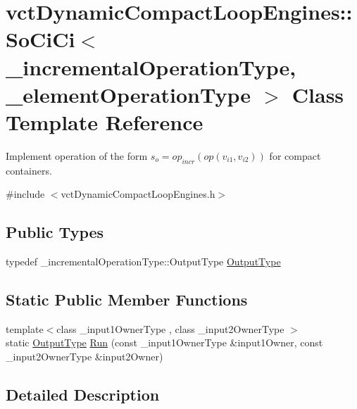 \hypertarget{classvct_dynamic_compact_loop_engines_1_1_so_ci_ci}{}\section{vct\+Dynamic\+Compact\+Loop\+Engines\+:\+:So\+Ci\+Ci$<$ \+\_\+incremental\+Operation\+Type, \+\_\+element\+Operation\+Type $>$ Class Template Reference}
\label{classvct_dynamic_compact_loop_engines_1_1_so_ci_ci}


Implement operation of the form $s_o = op_{incr}(op(v_{i1}, v_{i2}))$ for compact containers.  




{\ttfamily \#include $<$vct\+Dynamic\+Compact\+Loop\+Engines.\+h$>$}

\subsection*{Public Types}
\begin{DoxyCompactItemize}
\item 
typedef \+\_\+incremental\+Operation\+Type\+::\+Output\+Type \hyperlink{classvct_dynamic_compact_loop_engines_1_1_so_ci_ci_ab00f75cd43ad2aa4ca177a1522f73fe2}{Output\+Type}
\end{DoxyCompactItemize}
\subsection*{Static Public Member Functions}
\begin{DoxyCompactItemize}
\item 
{\footnotesize template$<$class \+\_\+input1\+Owner\+Type , class \+\_\+input2\+Owner\+Type $>$ }\\static \hyperlink{classvct_dynamic_compact_loop_engines_1_1_so_ci_ci_ab00f75cd43ad2aa4ca177a1522f73fe2}{Output\+Type} \hyperlink{classvct_dynamic_compact_loop_engines_1_1_so_ci_ci_af8e68cdb182a4db1edcdcc4fa00c545c}{Run} (const \+\_\+input1\+Owner\+Type \&input1\+Owner, const \+\_\+input2\+Owner\+Type \&input2\+Owner)
\end{DoxyCompactItemize}


\subsection{Detailed Description}

